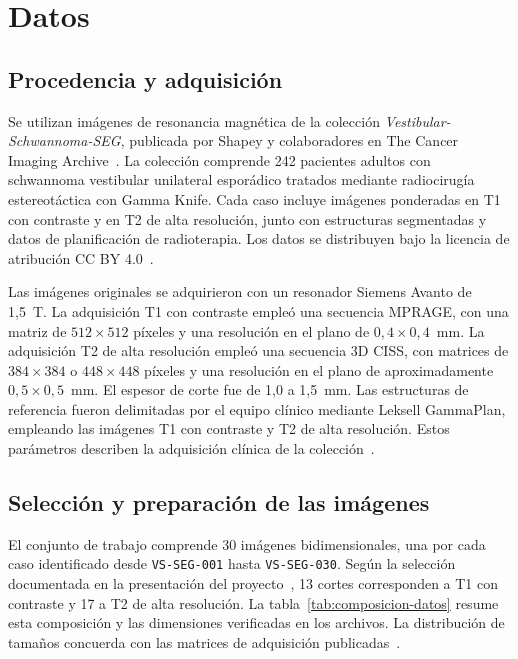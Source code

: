 \section{Datos}
\label{sec:datos}

\subsection{Procedencia y adquisición}

Se utilizan imágenes de resonancia magnética de la colección
\textit{Vestibular-Schwannoma-SEG}, publicada por Shapey y colaboradores en
The Cancer Imaging Archive~\cite{clark2013}. La colección comprende 242 pacientes adultos con
schwannoma vestibular unilateral esporádico tratados mediante radiocirugía
estereotáctica con Gamma Knife. Cada caso incluye imágenes ponderadas en T1
con contraste y en T2 de alta resolución, junto con estructuras segmentadas
y datos de planificación de radioterapia. Los datos se distribuyen bajo la
licencia de atribución CC BY 4.0~\cite{shapeydatos}.

Las imágenes originales se adquirieron con un resonador Siemens Avanto de
1,5~T. La adquisición T1 con contraste empleó una secuencia MPRAGE, con una
matriz de $512\times512$ píxeles y una resolución en el plano de
$0{,}4\times0{,}4$~mm. La adquisición T2 de alta resolución empleó una
secuencia 3D CISS, con matrices de $384\times384$ o $448\times448$ píxeles y
una resolución en el plano de aproximadamente $0{,}5\times0{,}5$~mm. El
espesor de corte fue de 1,0 a 1,5~mm. Las estructuras de referencia fueron
delimitadas por el equipo clínico mediante Leksell GammaPlan, empleando
las imágenes T1 con contraste y T2 de alta resolución. Estos parámetros describen
la adquisición clínica de la colección~\cite{shapey2021}.

\subsection{Selección y preparación de las imágenes}

El conjunto de trabajo comprende 30 imágenes bidimensionales, una por cada
caso identificado desde \texttt{VS-SEG-001} hasta \texttt{VS-SEG-030}. Según
la selección documentada en la presentación del proyecto~\cite{presentacion}, 13 cortes
corresponden a T1 con contraste y 17 a T2 de alta resolución. La
tabla~\ref{tab:composicion-datos} resume esta composición y las dimensiones
verificadas en los archivos. La distribución de tamaños concuerda con las
matrices de adquisición publicadas~\cite{shapey2021}.

